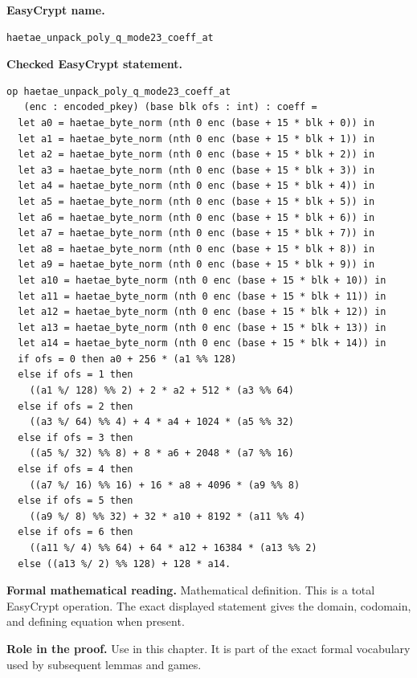 \begin{formaldefinition}
\noindent\textbf{EasyCrypt name.}
\begin{lstlisting}[language=EasyCrypt,basicstyle=\ttfamily\scriptsize]
haetae_unpack_poly_q_mode23_coeff_at
\end{lstlisting}
\noindent\textbf{Checked EasyCrypt statement.}
\begin{lstlisting}[language=EasyCrypt,basicstyle=\ttfamily\scriptsize]
op haetae_unpack_poly_q_mode23_coeff_at
   (enc : encoded_pkey) (base blk ofs : int) : coeff =
  let a0 = haetae_byte_norm (nth 0 enc (base + 15 * blk + 0)) in
  let a1 = haetae_byte_norm (nth 0 enc (base + 15 * blk + 1)) in
  let a2 = haetae_byte_norm (nth 0 enc (base + 15 * blk + 2)) in
  let a3 = haetae_byte_norm (nth 0 enc (base + 15 * blk + 3)) in
  let a4 = haetae_byte_norm (nth 0 enc (base + 15 * blk + 4)) in
  let a5 = haetae_byte_norm (nth 0 enc (base + 15 * blk + 5)) in
  let a6 = haetae_byte_norm (nth 0 enc (base + 15 * blk + 6)) in
  let a7 = haetae_byte_norm (nth 0 enc (base + 15 * blk + 7)) in
  let a8 = haetae_byte_norm (nth 0 enc (base + 15 * blk + 8)) in
  let a9 = haetae_byte_norm (nth 0 enc (base + 15 * blk + 9)) in
  let a10 = haetae_byte_norm (nth 0 enc (base + 15 * blk + 10)) in
  let a11 = haetae_byte_norm (nth 0 enc (base + 15 * blk + 11)) in
  let a12 = haetae_byte_norm (nth 0 enc (base + 15 * blk + 12)) in
  let a13 = haetae_byte_norm (nth 0 enc (base + 15 * blk + 13)) in
  let a14 = haetae_byte_norm (nth 0 enc (base + 15 * blk + 14)) in
  if ofs = 0 then a0 + 256 * (a1 %% 128)
  else if ofs = 1 then
    ((a1 %/ 128) %% 2) + 2 * a2 + 512 * (a3 %% 64)
  else if ofs = 2 then
    ((a3 %/ 64) %% 4) + 4 * a4 + 1024 * (a5 %% 32)
  else if ofs = 3 then
    ((a5 %/ 32) %% 8) + 8 * a6 + 2048 * (a7 %% 16)
  else if ofs = 4 then
    ((a7 %/ 16) %% 16) + 16 * a8 + 4096 * (a9 %% 8)
  else if ofs = 5 then
    ((a9 %/ 8) %% 32) + 32 * a10 + 8192 * (a11 %% 4)
  else if ofs = 6 then
    ((a11 %/ 4) %% 64) + 64 * a12 + 16384 * (a13 %% 2)
  else ((a13 %/ 2) %% 128) + 128 * a14.
\end{lstlisting}
\noindent\textbf{Formal mathematical reading.}
Mathematical definition. This is a total EasyCrypt operation.  The exact displayed statement gives the domain, codomain, and defining equation when present.

\noindent\textbf{Role in the proof.}
Use in this chapter. It is part of the exact formal vocabulary used by subsequent lemmas and games.

\end{formaldefinition}

